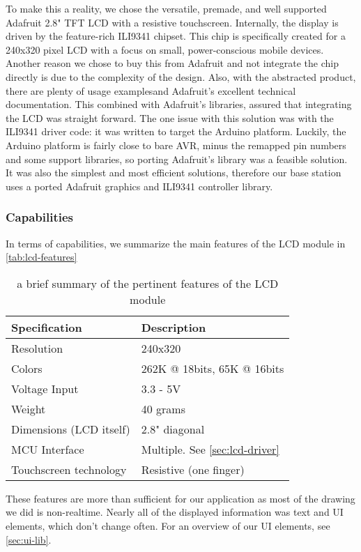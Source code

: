 To make this a reality, we chose the versatile, premade, and well
supported Adafruit 2.8" TFT LCD\cite{link3} with a resistive touchscreen.
Internally, the display is driven by the feature-rich
ILI9341 chipset.\cite{link22}
This chip is specifically created for a 240x320 pixel LCD with a focus on
small, power-conscious mobile devices. Another reason we chose to buy this from
Adafruit and not integrate the chip directly is due to the complexity of the
design. Also, with the abstracted product, there are
plenty
of usage examples\cite{link23}and Adafruit's
excellent
technical documentation.\cite{link24} This combined with Adafruit's
libraries\cite{link25}, assured
that integrating the LCD was straight forward. The one issue with
this solution was with the ILI9341 driver code: it was written to target the
Arduino platform. Luckily, the Arduino platform is fairly close to bare AVR, minus
the remapped pin numbers and some support libraries, so porting Adafruit's
library was a feasible solution. It was also the simplest and most efficient
solutions, therefore our base station uses a ported Adafruit graphics and ILI9341
controller library.

\subsubsection{Capabilities}
In terms of capabilities, we summarize the main features of the LCD module in \autoref{tab:lcd-features}

\begin{table}[H]
\centering
\begin{tabular}{|l|l|}
\hline
\bfseries Specification & \bfseries Description \\ \hline
Resolution & 240x320 \\ \hline
Colors & 262K @ 18bits, 65K @ 16bits \\ \hline
Voltage Input & 3.3 - 5V \\ \hline
Weight & 40 grams \\ \hline
Dimensions (LCD itself) & 2.8" diagonal \\ \hline
MCU Interface & Multiple. See \autoref{sec:lcd-driver}\\ \hline
Touchscreen technology & Resistive (one finger)\\
\hline
\end{tabular}
\caption{a brief summary of the pertinent features of the LCD module}
\label{tab:lcd-features}
\end{table}

These features are more than sufficient for our application as most of the
drawing we did is non-realtime. Nearly all of the displayed
information was text and UI elements, which don't change often. For an
overview of our UI elements, see \autoref{sec:ui-lib}.

